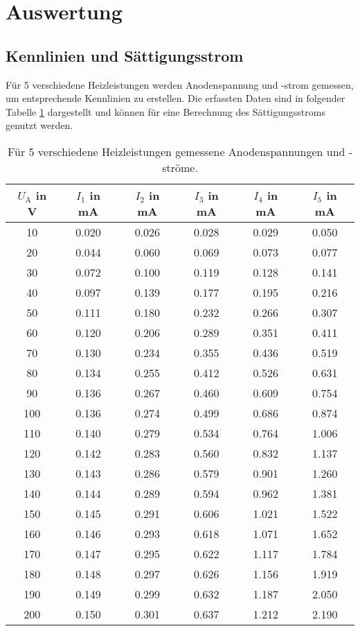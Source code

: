 \section{Auswertung}
\label{sec:Auswertung}

\subsection{Kennlinien und Sättigungsstrom}
\label{sec:str}

Für 5 verschiedene Heizleistungen werden Anodenspannung und -strom gemessen, um entsprechende Kennlinien zu erstellen.
Die erfassten Daten sind in folgender Tabelle \ref{tab:messwerte} dargestellt und können für eine Berechnung des Sättigungsstroms genutzt werden.
\begin{table}
\centering
\caption{Für 5 verschiedene Heizleistungen gemessene Anodenspannungen und -ströme.}
\label{tab:messwerte}
\begin{tabular}{c c c c c c}
\toprule
$U_\text{A}$ in V & $I_1$ in mA & $I_2$ in mA & $I_3$ in mA & $I_4$ in mA & $I_5$ in mA \\
\midrule
10  & 0.020 & 0.026 & 0.028 & 0.029 & 0.050 \\
20  & 0.044 & 0.060 & 0.069 & 0.073 & 0.077 \\
30  & 0.072 & 0.100 & 0.119 & 0.128 & 0.141 \\
40  & 0.097 & 0.139 & 0.177 & 0.195 & 0.216 \\
50  & 0.111 & 0.180 & 0.232 & 0.266 & 0.307 \\
60  & 0.120 & 0.206 & 0.289 & 0.351 & 0.411 \\
70  & 0.130 & 0.234 & 0.355 & 0.436 & 0.519 \\
80  & 0.134 & 0.255 & 0.412 & 0.526 & 0.631 \\
90  & 0.136 & 0.267 & 0.460 & 0.609 & 0.754 \\
100 & 0.136 & 0.274 & 0.499 & 0.686 & 0.874 \\
110 & 0.140 & 0.279 & 0.534 & 0.764 & 1.006 \\
120 & 0.142 & 0.283 & 0.560 & 0.832 & 1.137 \\
130 & 0.143 & 0.286 & 0.579 & 0.901 & 1.260 \\
140 & 0.144 & 0.289 & 0.594 & 0.962 & 1.381 \\
150 & 0.145 & 0.291 & 0.606 & 1.021 & 1.522 \\
160 & 0.146 & 0.293 & 0.618 & 1.071 & 1.652 \\
170 & 0.147 & 0.295 & 0.622 & 1.117 & 1.784 \\
180 & 0.148 & 0.297 & 0.626 & 1.156 & 1.919 \\
190 & 0.149 & 0.299 & 0.632 & 1.187 & 2.050 \\
200 & 0.150 & 0.301 & 0.637 & 1.212 & 2.190 \\
\bottomrule
\end{tabular}
\end{table}
